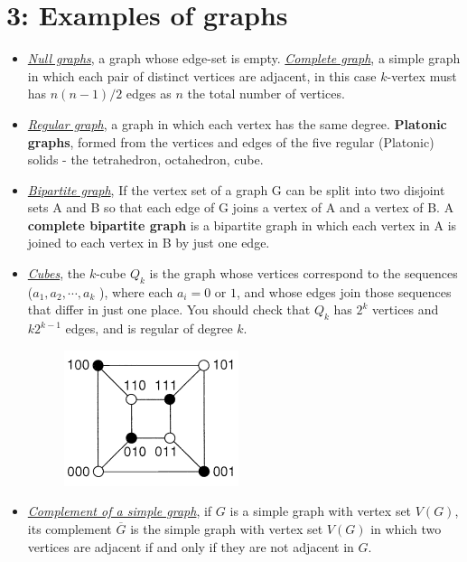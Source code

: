 \documentclass[12pt,a4paper, twocolumn]{article}
\begin{document}
\section*{3: Examples of graphs}
\begin{itemize}
	\item \underline{\emph{\color{magenta} Null graphs}}, a graph whose edge-set is empty. \underline{\emph{\color{magenta} Complete graph}}, a simple graph in which each pair of distinct vertices are adjacent, in this case $k$-vertex must has $n(n-1)/2$ edges as $n$ the total number of vertices.
	\item \underline{\emph{\color{magenta} Regular graph}}, a graph in which each vertex has the same degree. \textbf{Platonic graphs}, formed from the vertices and edges of the five regular (Platonic) solids - the tetrahedron, octahedron, cube.
	\item \underline{\emph{\color{magenta}Bipartite graph}}, If the vertex set of a graph G can be split into two disjoint sets A and B so that each edge of G joins a vertex of A and a vertex of B.  A \textbf{complete bipartite graph} is a bipartite graph in which each vertex in A is joined to each vertex in B by just one edge.
	\item \underline{\emph{\color{magenta} Cubes}}, the $k$-cube $Q_k$ is the graph whose vertices correspond to the sequences ($a_1, a_2, \cdots, a_k$ ), where each $a_i = 0 $ or $1$, and whose edges join those sequences that differ in just one place. You should check that $Q_k$ has $2^{k}$ vertices and $k 2^{k-1}$ edges, and is regular of degree $k$.\\
	\begin{figure}[h!]
	\centering
	\includegraphics[scale=0.7]{figures/cube1.png}
	\end{figure}
	\item \underline{\emph{\color{magenta}Complement of a simple graph}}, if $G$ is a simple graph with vertex set $V(G)$, its complement $\overline{G}$ is the simple graph with vertex set $V(G)$ in which two vertices are adjacent if and only if they are not adjacent in $G$.
\end{itemize}
\end{document}
